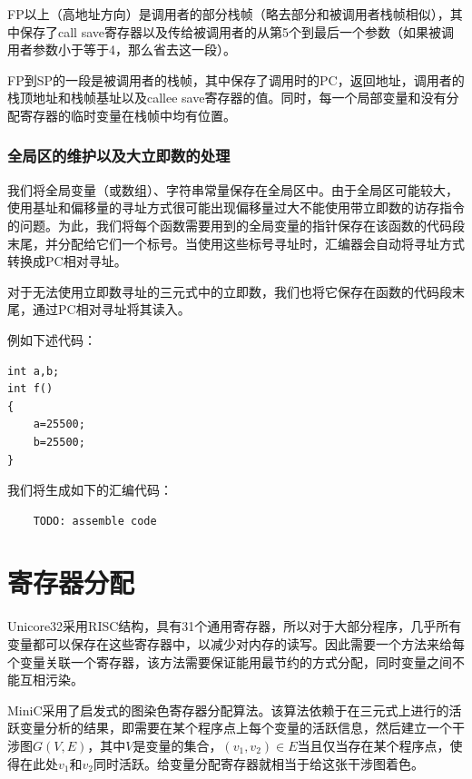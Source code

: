 FP以上（高地址方向）是调用者的部分栈帧（略去部分和被调用者栈帧相似），其中保存了call save寄存器以及传给被调用者的从第5个到最后一个参数（如果被调用者参数小于等于4，那么省去这一段）。

FP到SP的一段是被调用者的栈帧，其中保存了调用时的PC，返回地址，调用者的栈顶地址和栈帧基址以及callee save寄存器的值。同时，每一个局部变量和没有分配寄存器的临时变量在栈帧中均有位置。


\subsubsection{全局区的维护以及大立即数的处理}
我们将全局变量（或数组）、字符串常量保存在全局区中。由于全局区可能较大，使用基址和偏移量的寻址方式很可能出现偏移量过大不能使用带立即数的访存指令的问题。为此，我们将每个函数需要用到的全局变量的指针保存在该函数的代码段末尾，并分配给它们一个标号。当使用这些标号寻址时，汇编器会自动将寻址方式转换成PC相对寻址。

对于无法使用立即数寻址的三元式中的立即数，我们也将它保存在函数的代码段末尾，通过PC相对寻址将其读入。

例如下述代码：
\begin{lstlisting}
int a,b;
int f()
{
	a=25500;
	b=25500;
}

\end{lstlisting}
我们将生成如下的汇编代码：
\begin{verbatim}
	TODO: assemble code
\end{verbatim}
\section{寄存器分配}
Unicore32采用RISC结构，具有31个通用寄存器，所以对于大部分程序，几乎所有变量都可以保存在这些寄存器中，以减少对内存的读写。因此需要一个方法来给每个变量关联一个寄存器，该方法需要保证能用最节约的方式分配，同时变量之间不能互相污染。

MiniC采用了启发式的图染色寄存器分配算法。该算法依赖于在三元式上进行的活跃变量分析的结果，即需要在某个程序点上每个变量的活跃信息，然后建立一个干涉图$G(V,E)$，其中$V$是变量的集合，$(v_1,v_2)\in E$当且仅当存在某个程序点，使得在此处$v_1$和$v_2$同时活跃。给变量分配寄存器就相当于给这张干涉图着色。

